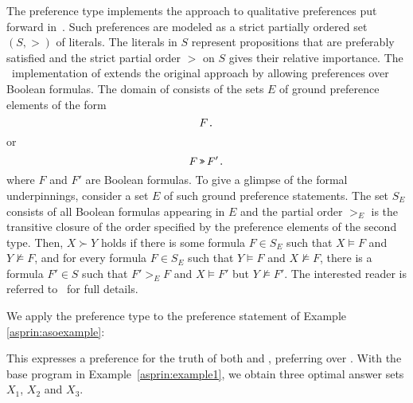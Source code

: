 The preference type  implements the approach to qualitative preferences put forward in~\cite{giumar12a}.
Such preferences are modeled as a strict partially ordered set
\(
(S,>)
\)
of literals.
The literals in $S$ represent propositions that are preferably satisfied
and the strict partial order $>$ on $S$ gives their relative importance.
%
The \asprin\ implementation of  extends the original approach by allowing preferences over Boolean formulas.
The domain of  consists of the sets $E$ of ground preference elements of the form
\[F\texttt{.}\]
or 
\[F \, \texttt{>>} \, F'\texttt{.}\]
where $F$ and $F'$ are Boolean formulas.
%
To give a glimpse of the formal underpinnings,
consider a set $E$ of such ground preference statements.
The set $S_E$ consists of all Boolean formulas appearing in $E$
and the partial order $>_E$ is the transitive closure of the order 
specified by the preference elements of the second type. 
Then, $X \succ Y$ holds if 
there is some formula $F \in S_E$ such that $X \models F$ and $Y \not\models F$, 
and for every formula $F \in S_E$ such that $Y \models F$ and $X \not\models F$, 
there is a formula
$F'\in S$ such that $F'>_{E}F$ and $X \models F'$ but $Y \not\models F'$.  The interested reader is referred to~\cite{giumar12a} for full details.  %
\begin{example}
%
%
We apply the preference type  to the preference statement of Example \ref{asprin:asoexample}:
%

%
This expresses a preference for the truth of both  and , 
preferring \code{a/1} over \code{b/1}.
With the base program in Example~\ref{asprin:example1}, 
we obtain three optimal answer sets $X_1$, $X_2$ and $X_3$.  
\end{example} %

